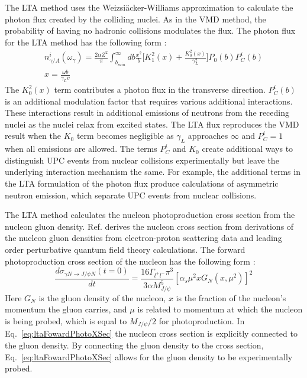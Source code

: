     The LTA method uses the Weizsi\"{a}cker-Williams approximation to calculate 
      the photon flux created by the colliding nuclei. 
    As in the VMD method, the probability of having no hadronic collisions 
      modulates the flux.
    The photon flux for the LTA method has the following form \cite{lta2011.09}:
    \begin{eqnarray} \label{eq:ltaPhotonFlux}
      n_{\gamma/A}^{i}(\omega_{\gamma})=\frac{2\alpha Z^{2}}{\pi}\int_{b_{min}}^{\infty}
        db\frac{x^{2}}{b}\Big[K_{1}^{2}(x)+\frac{K_{0}^{2}(x)}{\gamma_{L}^{2}}\Big]
        P_{0}(b)P_{C}^{i}(b) \\
      x=\frac{\omega b}{\gamma_{L} v} \nonumber 
    \end{eqnarray}
    The $K_{0}^{2}(x)$ term contributes a photon flux in the 
      transverse direction.
    $P_{C}^{i}(b)$ is an additional modulation factor that requires various 
      additional interactions. 
    These interactions result in additional emissions of neutrons from the 
      receding nuclei as the nuclei relax from excited states. 
    The LTA flux reproduces the VMD result when the $K_{0}$ term becomes 
      negligible as $\gamma_{L}$ approaches $\infty$ and $P_{C}^{i}=1$ when all
      emissions are allowed.
    The terms $P_{C}^{i}$ and $K_{0}$ create additional ways to distinguish UPC
      events from nuclear collisions experimentally but leave the underlying 
      interaction mechanism the same. 
    For example, the additional terms in the LTA formulation of the photon flux
      produce calculations of asymmetric neutron emission, which separate UPC 
      events from nuclear collisions.  

    The LTA method calculates the nucleon photoproduction cross section 
      from the nucleon gluon density. 
    Ref. \cite{lta2011.09} derives the nucleon cross section from derivations
     of the nucleon gluon densities from electron-proton scattering data and
     leading order perturbative quantum field theory calculations.
    The forward photoproduction cross section of the nucleon has the following
     form \cite{lta2011.09}:
   \begin{equation} \label{eq:ltaFowardPhotoXSec}
     \frac{d\sigma_{\gamma N\rightarrow J/\psi N}(t=0)}{dt}=\frac{16\Gamma_{l^{+}l^{-}}\pi^{3}}
     {3\alpha M_{J/\psi}^{5}}[\alpha_{s}\mu^{2}xG_{N}(x,\mu^{2})]^{2}
   \end{equation}
   Here $G_{N}$ is the gluon density of the nucleon, $x$ is the fraction of
     the nucleon's momentum the gluon carries, and $\mu$ is related
     to momentum at which the nucleon is being probed, which is equal to 
     $M_{J/\psi}/2$ for \JPsi{} photoproduction.
   In Eq.~\ref{eq:ltaFowardPhotoXSec} the nucleon cross section is explicitly 
     connected to the gluon density.
   By connecting the gluon density to the cross section, Eq.~\ref{eq:ltaFowardPhotoXSec}
     allows for the gluon density to be experimentally probed. 

